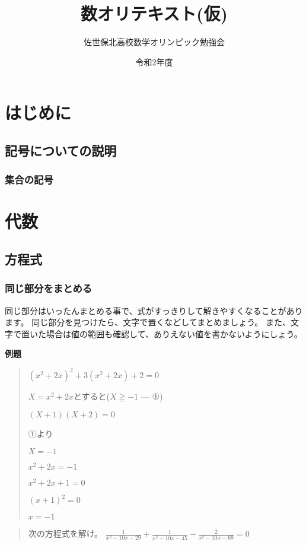 \documentclass[uplatex,fleqn]{jsbook}
\begin{document}
\title{数オリテキスト(仮)}
\author{佐世保北高校数学オリンピック勉強会}
\date{令和2年度}
\maketitle

\chapter{はじめに}
\section{記号についての説明}
\subsection{集合の記号}


\chapter{代数}
\section{方程式}
\subsection{同じ部分をまとめる}
同じ部分はいったんまとめる事で、式がすっきりして解きやすくなることがあります。
同じ部分を見つけたら、文字で置くなどしてまとめましょう。
また、文字で置いた場合は値の範囲も確認して、ありえない値を書かないようにしょう。

\vspace{15pt} {\large \textbf{例題}}
\begin{quote}
    $(x^2+2x)^2+3(x^2+2x)+2=0$

    $X=x^2+2x$とすると($X\geqq-1$ --- ①)

    $(X+1)(X+2)=0$

    ①より

    $X=-1$

    $x^2+2x=-1$

    $x^2+2x+1=0$

    $(x+1)^2=0$

    $x=-1$
\end{quote}

\begin{quote}
    次の方程式を解け。
    $\displaystyle \frac{1}{x^2-10x-29}+\frac{1}{x^2-10x-45}-\frac{2}{x^2-10x-69}=0$
\end{quote}
\end{document}
